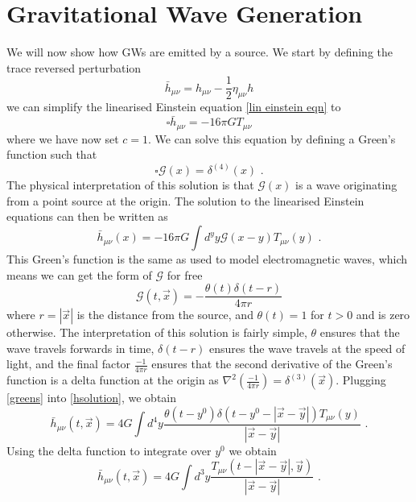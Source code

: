 \documentclass[11pt]{cuthesis}
\newcommand{\mn}{_{\mu\nu}}
\newcommand{\fs}{\text{ .}}
\begin{document}
\section{Gravitational Wave Generation} 
We will now show how GWs are emitted by a source. We start by defining the trace reversed perturbation
\begin{equation}
\bar{h}\mn = h\mn - \frac{1}{2} \eta\mn h
\end{equation}
we can simplify the linearised Einstein equation \ref{lin einstein eqn} to 
\begin{equation}
\square \bar{h}\mn = -16\pi G T\mn
\end{equation}
where we have now set $c=1$. We can solve this equation by defining a Green's function such that
\begin{equation}
\square \mathcal{G}(x)=\delta^{(4)}(x) \fs
\end{equation}
The physical interpretation of this solution is that $ \mathcal{G}(x)$ is a wave originating from a point source at the origin. The solution to the linearised Einstein equations can then be written as
\begin{equation} \label{hsolution}
\bar{h}\mn (x) = -16\pi G \int d^y y \mathcal{G}(x-y)T\mn (y) \fs
\end{equation}
This Green's function is the same as used to model electromagnetic waves, which means we can get the form of $\mathcal{G}$ for free
\begin{equation} \label{greens}
\mathcal{G}(t,\vec{x}) = -\frac{\theta(t) \delta(t-r)}{4\pi r}
\end{equation}
where $r=|\vec{x}|$ is the distance from the source, and $\theta(t)=1$ for $t>0$ and is zero otherwise. The interpretation of this solution is fairly simple, $\theta$ ensures that the wave travels forwards in time, $\delta(t-r)$ ensures the wave travels at the speed of light, and the final factor $\frac{-1}{4\pi r}$ ensures that the second derivative of the Green's function is a delta function at the origin as $\nabla^2\left(\frac{-1}{4\pi r}\right) = \delta^{(3)}(\vec{x})$. Plugging \ref{greens} into \ref{hsolution}, we obtain
\begin{equation}
\bar{h}\mn (t,\vec{x}) = 4G \int d^4 y \frac{\theta(t-y^0) \delta(t-y^0 - |\vec{x} - \vec{y}| ) T\mn (y) }{|\vec{x} - \vec{y}|} \fs
\end{equation}
Using the delta function to integrate over $y^0$ we obtain
\begin{equation}
\bar{h}\mn (t,\vec{x}) = 4G \int d^3 y \frac{T\mn (t-|\vec{x} - \vec{y}|,\vec{y})}{|\vec{x} - \vec{y}|} \fs
\end{equation} 
\end{document}
